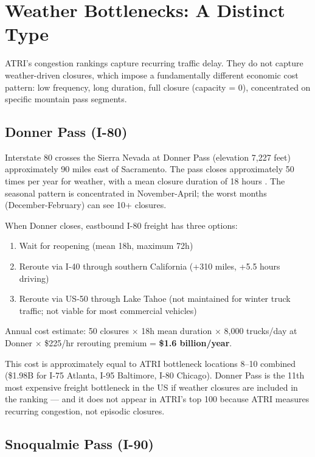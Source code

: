 \section{Weather Bottlenecks: A Distinct Type}

ATRI's congestion rankings capture recurring traffic delay. They do not capture weather-driven closures, which impose a fundamentally different economic cost pattern: low frequency, long duration, full closure (capacity = 0), concentrated on specific mountain pass segments.

\subsection{Donner Pass (I-80)}

Interstate 80 crosses the Sierra Nevada at Donner Pass (elevation 7,227 feet) approximately 90 miles east of Sacramento. The pass closes approximately 50 times per year for weather, with a mean closure duration of 18 hours \citep{Caltrans2023}. The seasonal pattern is concentrated in November-April; the worst months (December-February) can see 10+ closures.

When Donner closes, eastbound I-80 freight has three options:
\begin{enumerate}
\item Wait for reopening (mean 18h, maximum 72h)
\item Reroute via I-40 through southern California (+310 miles, +5.5 hours driving)
\item Reroute via US-50 through Lake Tahoe (not maintained for winter truck traffic; not viable for most commercial vehicles)
\end{enumerate}

Annual cost estimate: 50 closures $\times$ 18h mean duration $\times$ 8,000 trucks/day at Donner $\times$ \$225/hr rerouting premium = \textbf{\$1.6 billion/year}.

This cost is approximately equal to ATRI bottleneck locations 8--10 combined (\$1.98B for I-75 Atlanta, I-95 Baltimore, I-80 Chicago). Donner Pass is the 11th most expensive freight bottleneck in the US if weather closures are included in the ranking --- and it does not appear in ATRI's top 100 because ATRI measures recurring congestion, not episodic closures.

\subsection{Snoqualmie Pass (I-90)}

